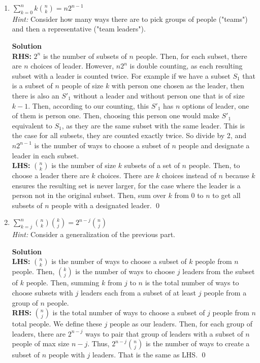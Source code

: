 \documentclass[11pt]{article}
\newenvironment{Parts}{\begin{enumerate}[label=(\alph*)]}{\end{enumerate}}
\newcommand*{\Part}{\item}
\begin{document}
\begin{Parts}
\Part $\sum_{k=0}^n k {n \choose k} = n2^{n-1}$ \\
\textit{Hint:} Consider how many ways there are to pick groups of people ("teams") and then a representative ("team leaders").
\begin{mdframed} \textbf{Solution} \\
\textbf{RHS: }$2^{n}$ is the number of subsets of $n$ people. Then, for each subset, there are $n$ choices of leader. However, $n2^n$ is double counting, as each resulting subset with a leader is counted twice. For example if we have a subset $S_1$ that is a subset of $n$ people of size $k$ with person one chosen as the leader, then there is also an $S'_1$ without a leader and without person one that is of size $k-1$. Then, according to our counting, this $S'_1$ has $n$ options of leader, one of them is person one. Then, choosing this person one would make $S'_1$ equivalent to $S_1$, as they are the same subset with the same leader. This is the case for all subsets, they are counted exactly twice. So divide by 2, and $n2^{n-1}$ is the number of ways to choose a subset of $n$ people and designate a leader in each subset. \\
\textbf{LHS: }$\binom{n}{k}$ is the number of size $k$ subsets of a set of $n$ people. Then, to choose a leader there are $k$ choices. There are $k$ choices instead of $n$ because $k$ ensures the resulting set is never larger, for the case where the leader is a person not in the original subset. Then, sum over $k$ from $0$ to $n$ to get all subsets of $n$ people with a designated leader. \qed 
\end{mdframed}

\Part $\sum_{k=j}^n {n \choose k} {k \choose j} = 2^{n-j} {n \choose j}$ \\
\textit{Hint:} Consider a generalization of the previous part.
\begin{mdframed} \textbf{Solution} \\
\textbf{LHS: }$\binom{n}{k}$ is the number of ways to choose a subset of $k$ people from $n$ people. Then, $\binom{k}{j}$ is the number of ways to choose $j$ leaders from the subset of $k$ people. Then, summing $k$ from $j$ to $n$ is the total number of ways to choose subsets with $j$ leaders each from a subset of at least $j$ people from a group of $n$ people. \\
\textbf{RHS: }$\binom{n}{j}$ is the total number of ways to choose a subset of $j$ people from $n$ total people. We define these $j$ people as our leaders. Then, for each group of leaders, there are $2^{n-j}$ ways to pair that group of leaders with a subset of $n$ people of max size $n-j$. Thus, $2^{n-j}\binom{n}{j}$ is the number of ways to create a subset of $n$ people with $j$ leaders. That is the same as LHS. \qed
\end{mdframed}

\end{Parts}
\end{document}
